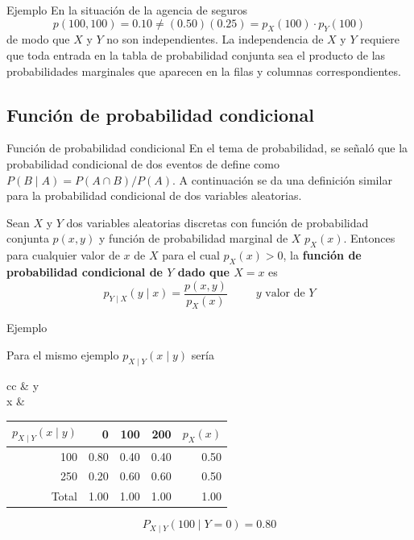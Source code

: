 \documentclass[11pt]{beamer}
\begin{document}
\begin{frame}{Ejemplo}
En la situación de la agencia de seguros 
$$p(100,100)=0.10 \ne (0.50)(0.25)=p_X(100)\cdot p_Y(100)$$
de modo que $X$ y $Y$ no son independientes. La independencia de $X$ y $Y$ requiere que toda
entrada en la tabla de probabilidad conjunta sea el producto de las probabilidades marginales que aparecen en la filas y columnas correspondientes.

\end{frame}




\subsection{Función de probabilidad condicional}
\begin{frame}{Función de probabilidad condicional}
En el tema de probabilidad, se señaló que la probabilidad condicional de dos eventos
de define como $P(B \mid A) = P(A \cap B) / P(A)$.  A continuación se da una definición similar para la probabilidad condicional de dos variables aleatorias.

\bigskip 
Sean $X$ y $Y$ dos variables aleatorias discretas con función de probabilidad conjunta $p(x,y)$ y función de probabilidad marginal de $X$ $p_X(x)$. Entonces para  cualquier valor de $x$ de $X$ para el cual $p_X(x)>0$, la {\bf función de probabilidad condicional de $Y$ dado que $X=x$} es
$$p_{Y\mid X}(y\mid x)=\frac{p(x,y)}{p_X(x)} \hspace{30pt} y \mbox{ valor de } Y$$

\end{frame}


\begin{frame}{Ejemplo}

Para el mismo ejemplo $p_{X \mid Y}(x \mid y)$  sería
\begin{center}
\begin{tabular}{cc}
& y \\
x &
\begin{tabular}{r|rrr|r}
$p_{X \mid Y}(x \mid y)$ & 0 &  100 & 200 & $p_X(x)$ \\
\hline 
100 & 0.80 & 0.40 & 0.40  & 0.50 \\
250 & 0.20 & 0.60 & 0.60 & 0.50 \\
\hline
 Total     & 1.00 & 1.00 & 1.00 & 1.00
\end{tabular}
\end{tabular}
\end{center}


$$P_{X \mid Y}(100 \mid Y=0)=0.80$$
\end{frame}
\end{document}
